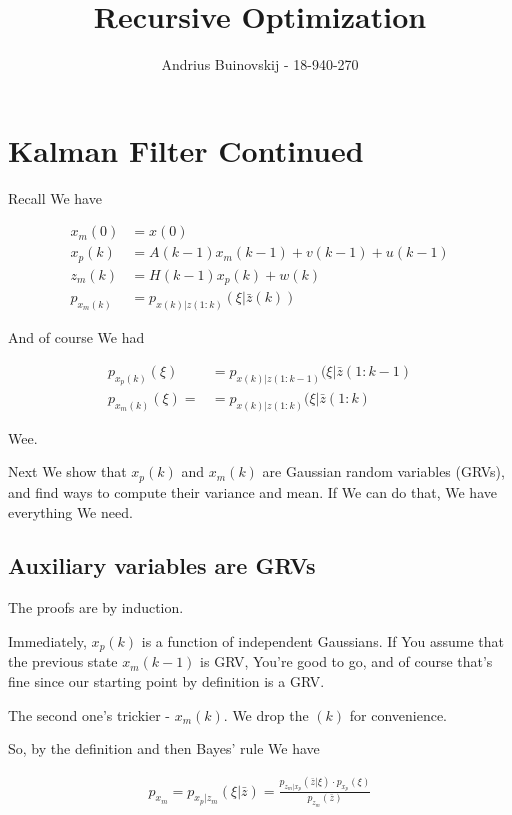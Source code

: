 \documentclass{article}
\begin{document}
\title{Recursive Optimization}
\author{Andrius Buinovskij - 18-940-270}
\date{}

\maketitle

\section{Kalman Filter Continued}

	Recall We have
	
	\begin{align}
		x_m(0) &= x(0)\\
		x_p(k) &= A(k-1)x_m(k-1) + v(k-1) + u(k-1)\\
		z_m(k) &= H(k-1)x_p(k) + w(k)\\
		p_{x_m(k)} &= p_{x(k)|z(1:k)}(\xi|\bar{z}(k))
	\end{align}
	
	And of course We had 
	
	\begin{align}
		p_{x_p(k)}(\xi) &= p_{x(k)|z(1:k-1)}(\xi|\bar{z}(1:k-1)\\
		p_{x_m(k)}(\xi) = &= p_{x(k)|z(1:k)}(\xi|\bar{z}(1:k)
	\end{align}
	
	Wee. 
	
	Next We show that $x_p(k)$ and $x_m(k)$ are Gaussian random variables (GRVs), and find ways to compute their variance and mean. If We can do that, We have everything We need.
	
	\subsection{Auxiliary variables are GRVs}
	
		The proofs are by induction.
		
		Immediately, $x_p(k)$ is a function of independent Gaussians. If You assume that the previous state $x_m(k-1)$ is GRV, You're good to go, and of course that's fine since our starting point by definition is a GRV.
		
		The second one's trickier - $x_m(k)$. We drop the $(k)$ for convenience. 
		
		So, by the definition and then Bayes' rule We have
		
		\begin{align}
			p_{x_m} = p_{x_p|z_m}(\xi|\bar{z}) = \frac{p_{z_m|x_p}(\bar{z}|\xi)\cdot p_{x_p}(\xi)}{p_{z_m}(\bar{z})}
		\end{align}
	
\end{document}
